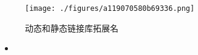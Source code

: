 
\begin{issues}
\issueDraft
\end{issues}

\begin{figure}[ht]
\centering
\texttt{[image: ./figures/a119070580b69336.png]}
\caption{动态和静态链接库拓展名} \label{fig_MacDev_1}
\end{figure}

\begin{itemize}
\item 
\end{itemize}

